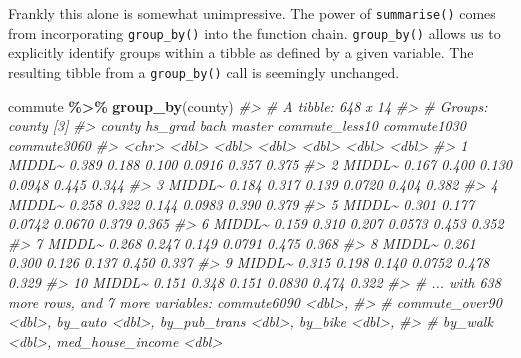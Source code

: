 \documentclass[
]{book}
\newenvironment{Shaded}{\begin{snugshade}}{\end{snugshade}}
\newcommand{\CommentTok}[1]{\textcolor[rgb]{0.56,0.35,0.01}{\textit{#1}}}
\newcommand{\KeywordTok}[1]{\textcolor[rgb]{0.13,0.29,0.53}{\textbf{#1}}}
\newcommand{\NormalTok}[1]{#1}
\newcommand{\OperatorTok}[1]{\textcolor[rgb]{0.81,0.36,0.00}{\textbf{#1}}}
\newcommand{\StringTok}[1]{\textcolor[rgb]{0.31,0.60,0.02}{#1}}
\begin{document}
Frankly this alone is somewhat unimpressive. The power of \texttt{summarise()} comes from incorporating \texttt{group\_by()} into the function chain. \texttt{group\_by()} allows us to explicitly identify groups within a tibble as defined by a given variable. The resulting tibble from a \texttt{group\_by()} call is seemingly unchanged.

\begin{Shaded}
\begin{Highlighting}[]
\NormalTok{commute }\OperatorTok{\%\textgreater{}\%}\StringTok{ }
\StringTok{  }\KeywordTok{group\_by}\NormalTok{(county)}
\CommentTok{\#\textgreater{} \# A tibble: 648 x 14}
\CommentTok{\#\textgreater{} \# Groups:   county [3]}
\CommentTok{\#\textgreater{}    county hs\_grad  bach master commute\_less10 commute1030 commute3060}
\CommentTok{\#\textgreater{}    \textless{}chr\textgreater{}    \textless{}dbl\textgreater{} \textless{}dbl\textgreater{}  \textless{}dbl\textgreater{}          \textless{}dbl\textgreater{}       \textless{}dbl\textgreater{}       \textless{}dbl\textgreater{}}
\CommentTok{\#\textgreater{}  1 MIDDL\textasciitilde{}   0.389 0.188 0.100          0.0916       0.357       0.375}
\CommentTok{\#\textgreater{}  2 MIDDL\textasciitilde{}   0.167 0.400 0.130          0.0948       0.445       0.344}
\CommentTok{\#\textgreater{}  3 MIDDL\textasciitilde{}   0.184 0.317 0.139          0.0720       0.404       0.382}
\CommentTok{\#\textgreater{}  4 MIDDL\textasciitilde{}   0.258 0.322 0.144          0.0983       0.390       0.379}
\CommentTok{\#\textgreater{}  5 MIDDL\textasciitilde{}   0.301 0.177 0.0742         0.0670       0.379       0.365}
\CommentTok{\#\textgreater{}  6 MIDDL\textasciitilde{}   0.159 0.310 0.207          0.0573       0.453       0.352}
\CommentTok{\#\textgreater{}  7 MIDDL\textasciitilde{}   0.268 0.247 0.149          0.0791       0.475       0.368}
\CommentTok{\#\textgreater{}  8 MIDDL\textasciitilde{}   0.261 0.300 0.126          0.137        0.450       0.337}
\CommentTok{\#\textgreater{}  9 MIDDL\textasciitilde{}   0.315 0.198 0.140          0.0752       0.478       0.329}
\CommentTok{\#\textgreater{} 10 MIDDL\textasciitilde{}   0.151 0.348 0.151          0.0830       0.474       0.322}
\CommentTok{\#\textgreater{} \# ... with 638 more rows, and 7 more variables: commute6090 \textless{}dbl\textgreater{},}
\CommentTok{\#\textgreater{} \#   commute\_over90 \textless{}dbl\textgreater{}, by\_auto \textless{}dbl\textgreater{}, by\_pub\_trans \textless{}dbl\textgreater{}, by\_bike \textless{}dbl\textgreater{},}
\CommentTok{\#\textgreater{} \#   by\_walk \textless{}dbl\textgreater{}, med\_house\_income \textless{}dbl\textgreater{}}
\end{Highlighting}
\end{Shaded}
\end{document}
